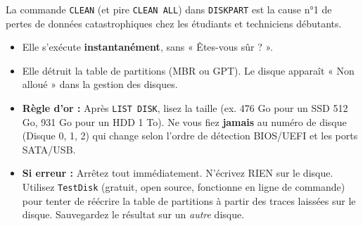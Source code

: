 \documentclass[11pt]{article}
\begin{document}
\begin{attention}
La commande \texttt{CLEAN} (et pire \texttt{CLEAN ALL}) dans \texttt{DISKPART} est la cause n°1 de pertes de données catastrophiques chez les étudiants et techniciens débutants.
\begin{itemize}
    \item Elle s'exécute \textbf{instantanément}, sans « Êtes-vous sûr ? ».
    \item Elle détruit la table de partitions (MBR ou GPT). Le disque apparaît « Non alloué » dans la gestion des disques.
    \item \textbf{Règle d'or :} Après \texttt{LIST DISK}, lisez la taille (ex. 476 Go pour un SSD 512 Go, 931 Go pour un HDD 1 To). Ne vous fiez \textbf{jamais} au numéro de disque (Disque 0, 1, 2) qui change selon l'ordre de détection BIOS/UEFI et les ports SATA/USB.
    \item \textbf{Si erreur :} Arrêtez tout immédiatement. N'écrivez RIEN sur le disque. Utilisez \texttt{TestDisk} (gratuit, open source, fonctionne en ligne de commande) pour tenter de réécrire la table de partitions à partir des traces laissées sur le disque. Sauvegardez le résultat sur un \emph{autre} disque.
\end{itemize}
\end{attention}
\end{document}
